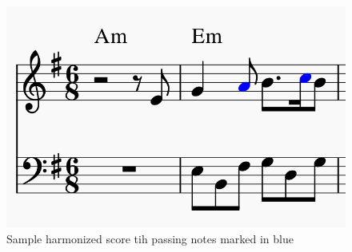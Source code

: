 \begin{figure}[h]
	\centering
	\includegraphics[width=0.4\linewidth]{imagenes/example_final_score.png}
	\caption{Sample harmonized score tih passing notes marked in blue}
	\label{fig:simple-piece-final}
\end{figure}


